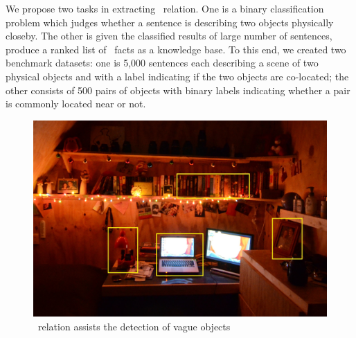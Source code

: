 
We propose two tasks in extracting \lnear\ relation.
One is a binary classification problem which judges whether 
a sentence is describing two objects physically closeby.
The other is given the classified results of 
large number of sentences, produce a ranked list of \lnear\
facts as a knowledge base.
To this end, we created two benchmark datasets: one is 5,000 sentences 
each describing a scene of two physical objects and with a label indicating 
if the two objects are co-located; 
the other consists of 500 pairs of objects with binary labels 
indicating whether a pair is commonly located near or not. 
\begin{figure}[th]
	\center
	\includegraphics[width=0.8\columnwidth]{dim-room.jpg}
	\caption{\lnear~relation assists the detection of vague objects}
	\label{fig:dim}
	\vspace{-0.6cm}
\end{figure}
%

